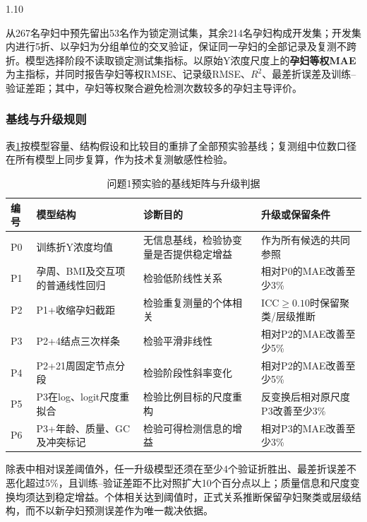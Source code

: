 \documentclass[12pt,a4paper]{ctexrep}
\numberwithin{equation}{section}
\begin{document}
\begin{spacing}{1.10}
{			从267名孕妇中预先留出53名作为锁定测试集，其余214名孕妇构成开发集；开发集内进行5折、以孕妇为分组单位的交叉验证，保证同一孕妇的全部记录及复测不跨折。模型选择阶段不读取锁定测试集指标。以原始Y浓度尺度上的\textbf{孕妇等权MAE}为主指标，并同时报告孕妇等权RMSE、记录级RMSE、$R^2$、最差折误差及训练--验证差距；其中，孕妇等权聚合避免检测次数较多的孕妇主导评价。

			\subsubsection{基线与升级规则}
			表\ref{tab:q1_baseline}按模型容量、结构假设和比较目的重排了全部预实验基线；复测组中位数口径在所有模型上同步复算，作为技术复测敏感性检验。

			\begin{table}[H]
			\centering
			\scriptsize
			\renewcommand{\arraystretch}{1.18}
			\setlength{\tabcolsep}{3pt}
			\caption{问题1预实验的基线矩阵与升级判据}
			\label{tab:q1_baseline}
			\begin{tabularx}{\textwidth}{@{}>{\centering\arraybackslash}p{}p{}X>{\raggedright\arraybackslash}p{}@{}}
			\toprule
			编号 & 模型结构 & 诊断目的 & 升级或保留条件 \\
			\midrule
			P0 & 训练折Y浓度均值 & 无信息基线，检验协变量是否提供稳定增益 & 作为所有候选的共同参照 \\
			P1 & 孕周、BMI及交互项的普通线性回归 & 检验低阶线性关系 & 相对P0的MAE改善至少3\% \\
			P2 & P1+收缩孕妇截距 & 检验重复测量的个体相关 & ICC$\geq0.10$时保留聚类/层级推断 \\
			P3 & P2+4结点三次样条 & 检验平滑非线性 & 相对P2的MAE改善至少5\% \\
			P4 & P2+21周固定节点分段 & 检验阶段性斜率变化 & 相对P2的MAE改善至少5\% \\
			P5 & P3在log、logit尺度重拟合 & 检验比例目标的尺度重构 & 反变换后相对原尺度P3改善至少3\% \\
			P6 & P3+年龄、质量、GC及冲突标记 & 检验可得检测信息的增益 & 相对P3的MAE改善至少3\% \\
			\bottomrule
			\end{tabularx}
			\end{table}

			除表中相对误差阈值外，任一升级模型还须在至少4个验证折胜出、最差折误差不恶化超过5\%，且训练--验证差距不比对照扩大10个百分点以上；质量信息和尺度变换均须达到稳定增益。个体相关达到阈值时，正式关系推断保留孕妇聚类或层级结构，而不以新孕妇预测误差作为唯一裁决依据。

}
\end{spacing}
\end{document}
